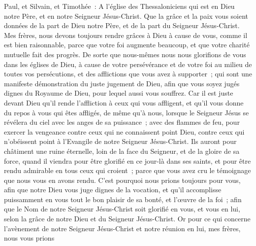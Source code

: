\begin{multicols}{2}
\VerseOne{}Paul, et Silvain, et Timothée~: A l'église des Thessaloniciens qui est en Dieu notre Père, et en notre Seigneur Jésus-Christ.
Que la grâce et la paix vous soient données de la part de Dieu notre Père, et de la part du Seigneur Jésus-Christ.
Mes frères, nous devons toujours rendre grâces à Dieu à cause de vous, comme il est bien raisonnable, parce que votre foi augmente beaucoup, et que votre charité mutuelle fait des progrès.
De sorte que nous-mêmes nous nous glorifions de vous dans les églises de Dieu, à cause de votre persévérance et de votre foi au milieu de toutes vos persécutions, et des afflictions que vous avez à supporter~;
qui sont une manifeste démonstration du juste jugement de Dieu, afin que vous soyez jugés dignes du Royaume de Dieu, pour lequel aussi vous souffrez.
Car il est juste devant Dieu qu'il rende l'affliction à ceux qui vous affligent,
et qu'il vous donne du repos à vous qui êtes affligés, de même qu'à nous, lorsque le Seigneur Jésus se révélera du ciel avec les anges de sa puissance~;
avec des flammes de feu, pour exercer la vengeance contre ceux qui ne connaissent point Dieu, contre ceux qui n'obéissent point à l'Evangile de notre Seigneur Jésus-Christ.
Ils auront pour châtiment une ruine éternelle, loin de la face du Seigneur, et de la gloire de sa force,
quand il viendra pour être glorifié en ce jour-là dans ses saints, et pour être rendu admirable en tous ceux qui croient~; parce que vous avez cru le témoignage que nous vous en avons rendu.
C'est pourquoi nous prions toujours pour vous, afin que notre Dieu vous juge dignes de la vocation, et qu'il accomplisse puissamment en vous tout le bon plaisir de sa bonté, et l'œuvre de la foi~;
afin que le Nom de notre Seigneur Jésus-Christ soit glorifié en vous, et vous en lui, selon la grâce de notre Dieu et du Seigneur Jésus-Christ.
\VerseOne{}Or pour ce qui concerne l'avènement de notre Seigneur Jésus-Christ et notre réunion en lui, mes frères, nous vous prions

\end{multicols}
